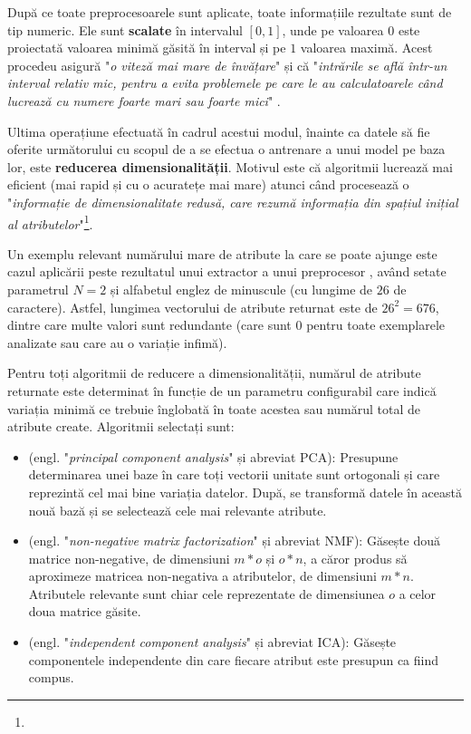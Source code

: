 \documentclass[../../main.tex]{subfiles}
\begin{document}
După ce toate preprocesoarele sunt aplicate, toate informațiile rezultate sunt de tip numeric. Ele sunt \textbf{scalate} în intervalul $ [0, 1] $, unde pe valoarea $ 0 $ este proiectată valoarea minimă găsită în interval și pe $ 1 $ valoarea maximă. Acest procedeu asigură "\textit{o viteză mai mare de învățare}" și că "\textit{intrările se află într-un interval relativ mic, pentru a evita problemele pe care le au calculatoarele când lucrează cu numere foarte mari sau foarte mici}" \cite{hundred_page_ml}.

Ultima operațiune efectuată în cadrul acestui modul, înainte ca datele să fie oferite următorului cu scopul de a se efectua o antrenare a unui model pe baza lor, este \textbf{reducerea dimensionalității}. Motivul este că algoritmii lucrează mai eficient (mai rapid și cu o acuratețe mai mare) atunci când procesează o "\textit{informație de dimensionalitate redusă, care rezumă informația din spațiul inițial al atributelor}"\footnote{}.

Un exemplu relevant numărului mare de atribute la care se poate ajunge este cazul aplicării peste rezultatul unui extractor  a unui preprocesor , având setate parametrul $ N = 2 $ și alfabetul englez de minuscule (cu lungime de $ 26 $ de caractere). Astfel, lungimea vectorului de atribute returnat este de $ 26^2 = 676 $, dintre care multe valori sunt redundante (care sunt $ 0 $ pentru toate exemplarele analizate sau care au o variație infimă).

Pentru toți algoritmii de reducere a dimensionalității, numărul de atribute returnate este determinat în funcție de un parametru configurabil care indică variația minimă ce trebuie înglobată în toate acestea sau numărul total de atribute create. Algoritmii selectați sunt:

\begin{itemize}
    \item {} (engl. "\textit{principal component ana\-lysis}" și abreviat PCA): Presupune determinarea unei baze în care toți vectorii unitate sunt ortogonali și care reprezintă cel mai bine variația datelor. După, se transformă datele în această nouă bază și se selectează cele mai relevante atribute.
    \item {} (engl. "\textit{non-negative matrix factorization}" și abreviat NMF): Găsește două matrice non-negative, de dimensiuni $ m * o $ și $ o * n $, a căror produs să aproximeze matricea non-negativa a atributelor, de dimensiuni $ m * n $. Atributele relevante sunt chiar cele reprezentate de dimensiunea $ o $ a celor doua matrice găsite.
    \item {} (engl. "\textit{independent component analysis}" și abreviat ICA): Găsește componentele independente din care fiecare atribut este presupun ca fiind compus.
\end{itemize}
\end{document}
